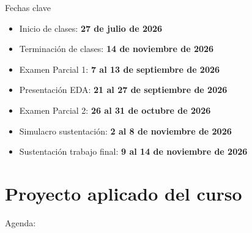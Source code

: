 \documentclass[10pt, xcolor=dvipsnames]{beamer}
\begin{document}
\begin{frame}{Fechas clave}
\begin{itemize}
  \item Inicio de clases: \textbf{27 de julio de 2026}
  \item Terminación de clases: \textbf{14 de noviembre de 2026}
  \item Examen Parcial 1: \textbf{7 al 13 de septiembre de 2026}
  \item Presentación EDA: \textbf{21 al 27 de septiembre de 2026}
  \item Examen Parcial 2: \textbf{26 al 31 de octubre de 2026}
  \item Simulacro sustentación: \textbf{2 al 8 de noviembre de 2026}
  \item Sustentación trabajo final: \textbf{9 al 14 de noviembre de 2026}
  
\end{itemize}
\end{frame}


\section{Proyecto aplicado del curso}
\begin{frame}[noframenumbering]{Agenda:}
\tableofcontents[currentsection]
\end{frame}
\end{document}

